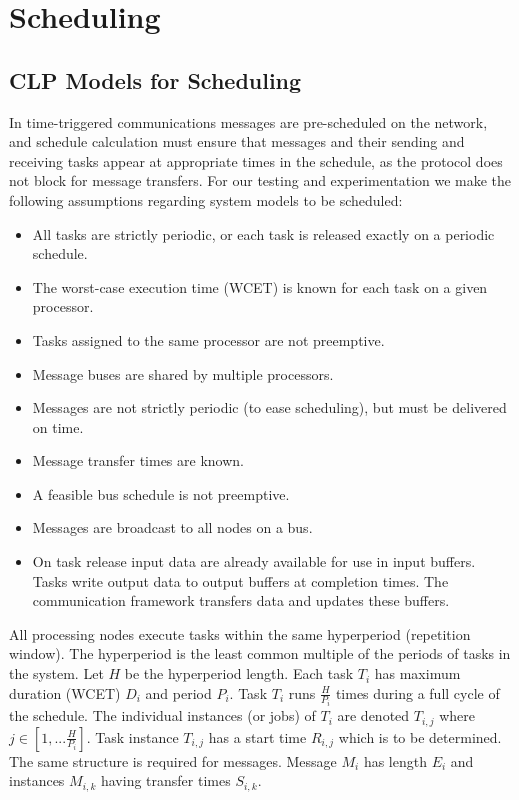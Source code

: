 
\section{Scheduling}
\label{scheduling}

\subsection{CLP Models for Scheduling}

In time-triggered communications messages are pre-scheduled on the network, and schedule calculation must ensure that messages and their sending and receiving tasks appear at appropriate times in the schedule, as the protocol does not block for message transfers.  For our testing and experimentation we make the following assumptions regarding system models to be scheduled:

\begin{itemize}
\item	All tasks are strictly periodic, or each task is released exactly on a periodic schedule.  
\item	The worst-case execution time (WCET) is known for each task on a given processor.
\item	Tasks assigned to the same processor are not preemptive.
\item	Message buses are shared by multiple processors.
\item	Messages are not strictly periodic (to ease scheduling), but must be delivered on time.
\item	Message transfer times are known.
\item	A feasible bus schedule is not preemptive.
\item Messages are broadcast to all nodes on a bus.
\item On task release input data are already available for use in input buffers. Tasks write output data to output buffers at completion times.  The communication framework transfers data and updates these buffers.
\end{itemize}

All processing nodes execute tasks within the same hyperperiod (repetition window\cite{sched:offline}).  The hyperperiod is the least common multiple of the periods of tasks in the system.  Let $H$ be the hyperperiod length. Each task $T_i$ has maximum duration (WCET) $D_i$ and period $P_i$. Task $T_i$ runs $\frac{H}{{P_i}}$  times during a full cycle of the schedule.  The individual instances (or jobs) of $T_i$ are denoted $T_{i,j}$ where $j \in [1,...\frac{H}{{P_i }}]$.
Task instance $T_{i,j}$ has a start time $R_{i,j}$ which is to be determined.
The same structure is required for messages.  Message $M_i$ has length $E_i$ and instances $M_{i,k}$ having transfer times $S_{i,k}$.

